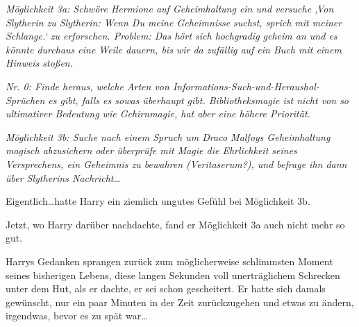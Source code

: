 \emph{Möglichkeit 3a: Schwöre Hermione auf Geheimhaltung ein und versuche ‚Von Slytherin zu Slytherin: Wenn Du meine Geheimnisse suchst, sprich mit meiner Schlange.‘ zu erforschen. Problem: Das hört sich hochgradig geheim an und es könnte durchaus eine Weile dauern, bis wir da zufällig auf ein Buch mit einem Hinweis stoßen.}

\emph{Nr. 0: Finde heraus, welche Arten von Informations-Such-und-Heraushol-Sprüchen es gibt, falls es sowas überhaupt gibt. Bibliotheksmagie ist nicht von so ultimativer Bedeutung wie Gehirnmagie, hat aber eine höhere Priorität.}

\emph{Möglichkeit 3b: Suche nach einem Spruch um Draco Malfoys Geheimhaltung magisch abzusichern oder überprüfe mit Magie die Ehrlichkeit seines Versprechens, ein Geheimnis zu bewahren (Veritaserum?), und befrage ihn dann über Slytherins Nachricht…}

Eigentlich…hatte Harry ein ziemlich ungutes Gefühl bei Möglichkeit 3b.

Jetzt, wo Harry darüber nachdachte, fand er Möglichkeit 3a auch nicht mehr so gut.

Harrys Gedanken sprangen zurück zum möglicherweise schlimmsten Moment seines bisherigen Lebens, diese langen Sekunden voll unerträglichem Schrecken unter dem Hut, als er dachte, er sei schon gescheitert. Er hatte sich damals gewünscht, nur ein paar Minuten in der Zeit zurückzugehen und etwas zu ändern, irgendwas, bevor es zu spät war…


